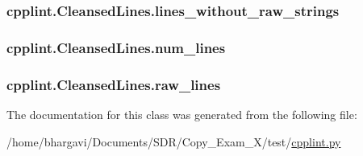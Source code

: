 \subsubsection[{\texorpdfstring{lines\+\_\+without\+\_\+raw\+\_\+strings}{lines_without_raw_strings}}]{\setlength{\rightskip}{0pt plus 5cm}cpplint.\+Cleansed\+Lines.\+lines\+\_\+without\+\_\+raw\+\_\+strings}\hypertarget{classcpplint_1_1_cleansed_lines_a0cc228ba3c00ba590b27a759cf8023ce}{}\label{classcpplint_1_1_cleansed_lines_a0cc228ba3c00ba590b27a759cf8023ce}
\subsubsection[{\texorpdfstring{num\+\_\+lines}{num_lines}}]{\setlength{\rightskip}{0pt plus 5cm}cpplint.\+Cleansed\+Lines.\+num\+\_\+lines}\hypertarget{classcpplint_1_1_cleansed_lines_a4b42ab48659954fb6e0a4e4eb483a45a}{}\label{classcpplint_1_1_cleansed_lines_a4b42ab48659954fb6e0a4e4eb483a45a}
\subsubsection[{\texorpdfstring{raw\+\_\+lines}{raw_lines}}]{\setlength{\rightskip}{0pt plus 5cm}cpplint.\+Cleansed\+Lines.\+raw\+\_\+lines}\hypertarget{classcpplint_1_1_cleansed_lines_a9e94ce9e4f682be33c04fe82429c4dfd}{}\label{classcpplint_1_1_cleansed_lines_a9e94ce9e4f682be33c04fe82429c4dfd}


The documentation for this class was generated from the following file\+:\begin{DoxyCompactItemize}
\item 
/home/bhargavi/\+Documents/\+S\+D\+R/\+Copy\+\_\+\+Exam\+\_\+X/test/\hyperlink{cpplint_8py}{cpplint.\+py}\end{DoxyCompactItemize}
